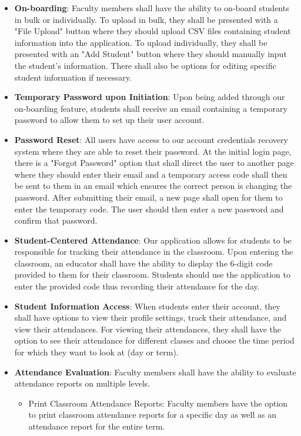 \documentclass[letterpaper,12pt,oneside,listof=totoc]{scrreprt}
\begin{document}
\begin{itemize}
    \item \textbf{On-boarding}: Faculty members shall have the ability to on-board students in bulk or individually. To upload in bulk, they shall be presented with a "File Upload" button where they should upload CSV files containing student information into the application. To upload individually, they shall be presented with an "Add Student" button where they should manually input the student's information. There shall also be options for editing specific student information if necessary.
    \item \textbf{Temporary Password upon Initiation}: Upon being added through our on-boarding feature, students shall receive an email containing a temporary password to allow them to set up their user account. 
    \item \textbf{Password Reset}: All users have access to our account credentials recovery system where they are able to reset their password. At the initial login page, there is a "Forgot Password" option that shall direct the user to another page where they should enter their email and a temporary access code shall then be sent to them in an email which ensures the correct person is changing the password. After submitting their email, a new page shall open for them to enter the temporary code. The user should then enter a new password and confirm that password. 
    \item \textbf{Student-Centered Attendance}: Our application allows for students to be responsible for tracking their attendance in the classroom. Upon entering the classroom, an educator shall have the ability to display the 6-digit code provided to them for their classroom. Students should use the application to enter the provided code thus recording their attendance for the day. 
    \item \textbf{Student Information Access}: When students enter their account, they shall have options to view their profile settings, track their attendance, and view their attendances. For viewing their attendances, they shall have the option to see their attendance for different classes and choose the time period for which they want to look at (day or term).
    \item \textbf{Attendance Evaluation}: Faculty members shall have the ability to evaluate attendance reports on multiple levels.
    \begin{itemize}
        \item Print Classroom Attendance Reports: Faculty members have the option to print classroom attendance reports for a specific day as well as an attendance report for the entire term. 

\end{itemize}
\end{itemize}
\end{document}
